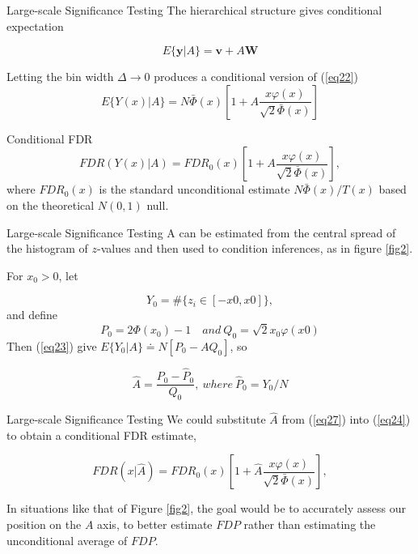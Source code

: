 \documentclass{beamer}
\begin{document}
\begin{frame}[t]{Large-scale Significance Testing}\vspace{10pt}
The hierarchical structure gives conditional expectation 

\begin{equation}\label{eq22}
E\{\boldsymbol{y}|A\} = \boldsymbol{v}+ A\boldsymbol{W}
\end{equation}

Letting the bin width $\Delta \rightarrow 0$ produces a conditional version of (\ref{eq22})
\begin{equation}\label{eq23}
E\{Y(x)|A\} = N\bar{\Phi}(x) \left[ 1+A\frac{x\varphi(x)}{\sqrt{2}\bar{\Phi}(x)} \right]
\end{equation}

Conditional FDR
\begin{equation}\label{eq24}
FDR(Y(x)|A) = FDR_0(x)\left[1+A\frac{x\varphi(x)}{\sqrt{2}\bar{\Phi}(x)} \right],
\end{equation}
where $FDR_0(x)$ is the standard unconditional estimate $N\bar{\Phi}(x)/T(x)$ based on the theoretical $N(0, 1)$ null.
\end{frame}

\begin{frame}[t]{Large-scale Significance Testing}\vspace{10pt}
A can be estimated from the central spread of the histogram of $z$-values and then used to condition inferences, as in figure \ref{fig2}.

For $x_0 > 0$, let 

\begin{equation}\label{eq25}
Y_0 = \#\{z_i \in [-x0,x0]\},
\end{equation}
and define
\begin{equation}\label{eq26}
P_0 =2\Phi(x_0) -1  \quad and \ Q_0 =\sqrt{2}x_0\varphi(x0)
\end{equation}
Then (\ref{eq23}) give $E\{Y_0|A\} \doteq N[P_0-AQ_0]$, so

\begin{equation}\label{eq27}
\hat{A} = \frac{P_0 - \hat{P}_0}{Q_0}, \ where\ \hat{P}_0 = Y_0/N
\end{equation}

\end{frame}

\begin{frame}[t]{Large-scale Significance Testing}\vspace{10pt}
We could substitute $\hat{A}$ from (\ref{eq27}) into (\ref{eq24}) to obtain a conditional FDR estimate,


\begin{equation}\label{eq28}
FDR(x|\hat{A}) = FDR_0(x)\left[1+\hat{A}\frac{x\varphi(x)}{\sqrt{2}\bar{\Phi}(x)} \right],
\end{equation}

\vspace{0.7cm}

In situations like that of Figure \ref{fig2}, the goal would be to accurately assess our position on the $A$ axis, to better estimate $FDP$ rather than estimating the unconditional average of $FDP$.
\end{frame}
\end{document}
